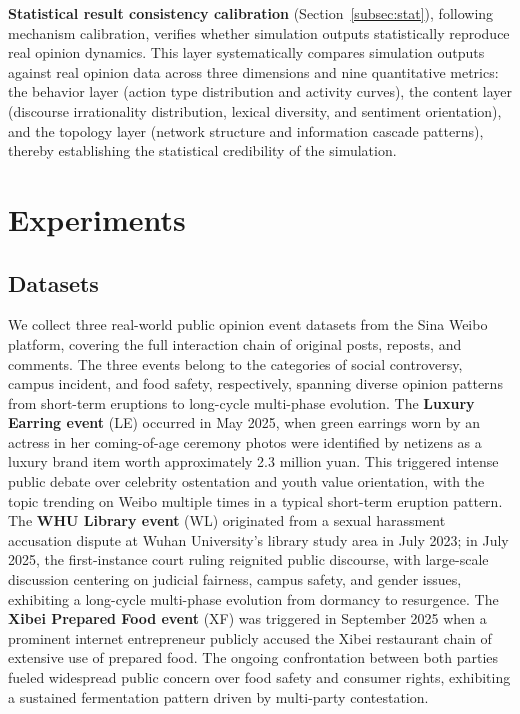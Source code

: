 \documentclass[a4paper,fleqn]{cas-dc}
\begin{document}
\textbf{Statistical result consistency calibration} (Section~\ref{subsec:stat}), following mechanism calibration, verifies whether simulation outputs statistically reproduce real opinion dynamics. This layer systematically compares simulation outputs against real opinion data across three dimensions and nine quantitative metrics: the behavior layer (action type distribution and activity curves), the content layer (discourse irrationality distribution, lexical diversity, and sentiment orientation), and the topology layer (network structure and information cascade patterns), thereby establishing the statistical credibility of the simulation.

\section{Experiments}\label{sec:exp}

\subsection{Datasets}

We collect three real-world public opinion event datasets from the Sina Weibo platform, covering the full interaction chain of original posts, reposts, and comments. The three events belong to the categories of social controversy, campus incident, and food safety, respectively, spanning diverse opinion patterns from short-term eruptions to long-cycle multi-phase evolution. The \textbf{Luxury Earring event} (LE) occurred in May 2025, when green earrings worn by an actress in her coming-of-age ceremony photos were identified by netizens as a luxury brand item worth approximately 2.3 million yuan. This triggered intense public debate over celebrity ostentation and youth value orientation, with the topic trending on Weibo multiple times in a typical short-term eruption pattern. The \textbf{WHU Library event} (WL) originated from a sexual harassment accusation dispute at Wuhan University's library study area in July 2023; in July 2025, the first-instance court ruling reignited public discourse, with large-scale discussion centering on judicial fairness, campus safety, and gender issues, exhibiting a long-cycle multi-phase evolution from dormancy to resurgence. The \textbf{Xibei Prepared Food event} (XF) was triggered in September 2025 when a prominent internet entrepreneur publicly accused the Xibei restaurant chain of extensive use of prepared food. The ongoing confrontation between both parties fueled widespread public concern over food safety and consumer rights, exhibiting a sustained fermentation pattern driven by multi-party contestation.
\end{document}
